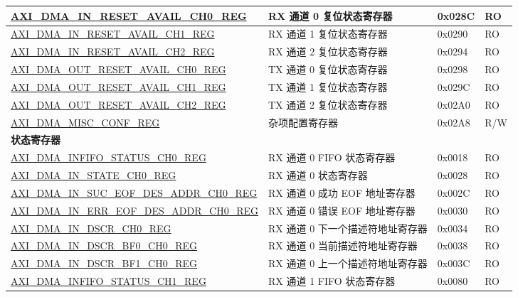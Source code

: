 \begin{longtable}{ | l | l | p{1.3cm} | l | }
\hyperref[regdesc:AXIDMAINRESETAVAILCHNREG]{AXI\_DMA\_IN\_RESET\_AVAIL\_CH0\_REG} & RX 通道 0 复位状态寄存器 & 0x028C & RO \\ \hline
\hyperref[regdesc:AXIDMAINRESETAVAILCHNREG]{AXI\_DMA\_IN\_RESET\_AVAIL\_CH1\_REG} & RX 通道 1 复位状态寄存器 & 0x0290 & RO \\ \hline
\hyperref[regdesc:AXIDMAINRESETAVAILCHNREG]{AXI\_DMA\_IN\_RESET\_AVAIL\_CH2\_REG} & RX 通道 2 复位状态寄存器 & 0x0294 & RO \\ \hline
\hyperref[regdesc:AXIDMAOUTRESETAVAILCHNREG]{AXI\_DMA\_OUT\_RESET\_AVAIL\_CH0\_REG} & TX 通道 0 复位状态寄存器 & 0x0298 & RO \\ \hline
\hyperref[regdesc:AXIDMAOUTRESETAVAILCHNREG]{AXI\_DMA\_OUT\_RESET\_AVAIL\_CH1\_REG} & TX 通道 1 复位状态寄存器 & 0x029C & RO \\ \hline
\hyperref[regdesc:AXIDMAOUTRESETAVAILCHNREG]{AXI\_DMA\_OUT\_RESET\_AVAIL\_CH2\_REG} & TX 通道 2 复位状态寄存器 & 0x02A0 & RO \\ \hline
\hyperref[regdesc:AXIDMAMISCCONFREG]{AXI\_DMA\_MISC\_CONF\_REG} & 杂项配置寄存器 & 0x02A8 & R/W \\ \hline
\multicolumn{4}{|l|}{\textbf{状态寄存器}} \\ \hline
\hyperref[regdesc:AXIDMAINFIFOSTATUSCHNREG]{AXI\_DMA\_INFIFO\_STATUS\_CH0\_REG} & RX 通道 0 FIFO 状态寄存器 & 0x0018 & RO \\ \hline
\hyperref[regdesc:AXIDMAINSTATECHNREG]{AXI\_DMA\_IN\_STATE\_CH0\_REG} & RX 通道 0 状态寄存器 & 0x0028 & RO \\ \hline
\hyperref[regdesc:AXIDMAINSUCEOFDESADDRCHNREG]{AXI\_DMA\_IN\_SUC\_EOF\_DES\_ADDR\_CH0\_REG} & RX 通道 0 成功 EOF 地址寄存器 & 0x002C & RO \\ \hline
\hyperref[regdesc:AXIDMAINERREOFDESADDRCHNREG]{AXI\_DMA\_IN\_ERR\_EOF\_DES\_ADDR\_CH0\_REG} & RX 通道 0 错误 EOF 地址寄存器 & 0x0030 & RO \\ \hline
\hyperref[regdesc:AXIDMAINDSCRCHNREG]{AXI\_DMA\_IN\_DSCR\_CH0\_REG} & RX 通道 0 下一个描述符地址寄存器 & 0x0034 & RO \\ \hline
\hyperref[regdesc:AXIDMAINDSCRBF0CHNREG]{AXI\_DMA\_IN\_DSCR\_BF0\_CH0\_REG} & RX 通道 0 当前描述符地址寄存器 & 0x0038 & RO \\ \hline
\hyperref[regdesc:AXIDMAINDSCRBF1CHNREG]{AXI\_DMA\_IN\_DSCR\_BF1\_CH0\_REG} & RX 通道 0 上一个描述符地址寄存器 & 0x003C & RO \\ \hline
\hyperref[regdesc:AXIDMAINFIFOSTATUSCHNREG]{AXI\_DMA\_INFIFO\_STATUS\_CH1\_REG} & RX 通道 1 FIFO 状态寄存器 & 0x0080 & RO \\ \hline

\end{longtable}
